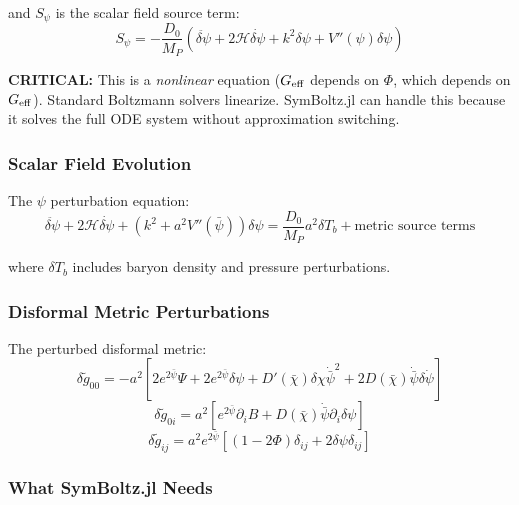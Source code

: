 \documentclass[11pt,a4paper]{article}
\begin{document}
and $S_\psi$ is the scalar field source term:
\begin{equation}
S_\psi = -\frac{D_0}{M_P}\left(\ddot{\delta\psi} + 2\mathcal{H}\dot{\delta\psi} + k^2\delta\psi + V''(\psi)\delta\psi\right)
\end{equation}

\textbf{CRITICAL:} This is a \emph{nonlinear} equation ($G_{\rm eff}$ depends on $\Phi$, which depends on $G_{\rm eff}$). Standard Boltzmann solvers linearize. SymBoltz.jl can handle this because it solves the full ODE system without approximation switching.

\subsubsection{Scalar Field Evolution}

The $\psi$ perturbation equation:
\begin{equation}
\ddot{\delta\psi} + 2\mathcal{H}\dot{\delta\psi} + \left(k^2 + a^2 V''(\bar{\psi})\right)\delta\psi = \frac{D_0}{M_P}a^2\delta T_b + \text{metric source terms}
\end{equation}

where $\delta T_b$ includes baryon density and pressure perturbations.

\subsubsection{Disformal Metric Perturbations}

The perturbed disformal metric:
\begin{equation}
\delta\tilde{g}_{00} = -a^2\left[2e^{2\bar{\psi}}\Psi + 2e^{2\bar{\psi}}\delta\psi + D'(\bar{\chi})\delta\chi\dot{\bar{\psi}}^2 + 2D(\bar{\chi})\dot{\bar{\psi}}\delta\dot{\psi}\right]
\end{equation}
\begin{equation}
\delta\tilde{g}_{0i} = a^2\left[e^{2\bar{\psi}}\partial_i B + D(\bar{\chi})\dot{\bar{\psi}}\partial_i\delta\psi\right]
\end{equation}
\begin{equation}
\delta\tilde{g}_{ij} = a^2 e^{2\bar{\psi}}\left[(1-2\Phi)\delta_{ij} + 2\delta\psi\delta_{ij}\right]
\end{equation}

\subsubsection{What SymBoltz.jl Needs}
\end{document}
